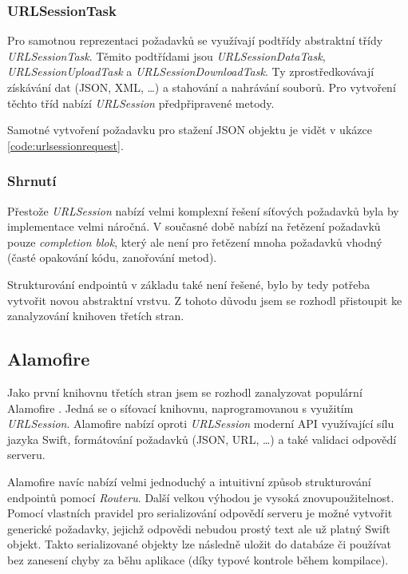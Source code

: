 
\subsubsection{URLSessionTask}

Pro samotnou reprezentaci požadavků se využívají podtřídy abstraktní třídy \textit{URLSessionTask}.
Těmito podtřídami jsou \textit{URLSessionDataTask}, \textit{URLSessionUploadTask} a \textit{URLSessionDownloadTask}.
Ty zprostředkovávají získávání dat (JSON, XML, \ldots) a stahování a nahrávání souborů.
Pro vytvoření těchto tříd nabízí \textit{URLSession} předpřipravené metody.

Samotné vytvoření požadavku pro stažení JSON objektu je vidět v ukázce \ref{code:urlsessionrequest}.


\subsubsection{Shrnutí}

Přestože \textit{URLSession} nabízí velmi komplexní řešení síťových požadavků byla by implementace velmi náročná.
V současné době nabízí na řetězení požadavků pouze \textit{completion blok}, který ale není pro řetězení mnoha požadavků vhodný (časté opakování kódu, zanořování metod).

Strukturování endpointů v základu také není řešené, bylo by tedy potřeba vytvořit novou abstraktní vrstvu.
Z tohoto důvodu jsem se rozhodl přistoupit ke zanalyzování knihoven třetích stran.

\subsection{Alamofire}

Jako první knihovnu třetích stran jsem se rozhodl zanalyzovat populární Alamofire \cite{github-alamofire}.
Jedná se o síťovací knihovnu, naprogramovanou s využitím \textit{URLSession}.
Alamofire nabízí oproti \textit{URLSession} moderní API využívající sílu jazyka Swift, formátování požadavků (JSON, URL, \ldots) a také validaci odpovědí serveru.

Alamofire navíc nabízí velmi jednoduchý a intuitivní způsob strukturování endpointů pomocí \textit{Routeru}.
Další velkou výhodou je vysoká znovupoužitelnost.
Pomocí vlastních pravidel pro serializování odpovědí serveru je možné vytvořit generické požadavky, jejichž odpovědi nebudou prostý text ale už platný Swift objekt.
Takto serializované objekty lze následně uložit do databáze či používat bez zanesení chyby za běhu aplikace (díky typové kontrole během kompilace).


